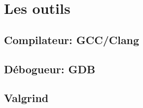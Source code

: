 \section{Les outils}
\subsection{Compilateur: GCC/Clang}
\subsection{Débogueur: GDB}
\subsection{Valgrind}